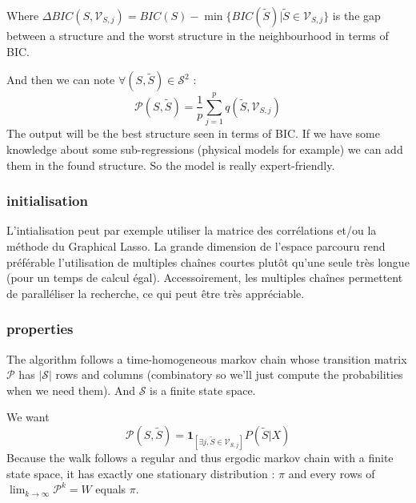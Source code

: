 \documentclass[12pt]{article}
\begin{document}
	Where $\Delta BIC(S,\mathcal{V}_{S,j})=BIC(S)-\min\{BIC(\tilde{S})| \tilde{S} \in \mathcal{V}_{S,j} \} $ is the gap between a structure and the worst structure in the neighbourhood in terms of BIC.
	\newline
	
	 And then we can note $\forall (S,\tilde{S}) \in \mathcal{S}^2 $ :
		\begin{displaymath}
			\mathcal{P}(S,\tilde{S})= \frac{1}{p} \sum_{j=1}^p q(\tilde{S},\mathcal{V}_{S,j})
		\end{displaymath}
	The output will be the best structure seen in terms of BIC. If we have some knowledge about some sub-regressions (physical models for example) we can add them in the found structure. So the model is really expert-friendly.



 \subsubsection{initialisation}
L'intialisation peut par exemple utiliser la matrice des corrélations et/ou la méthode du Graphical Lasso\cite{friedman2008sparse}.		
La grande dimension de l'espace parcouru rend préférable l'utilisation de multiples chaînes courtes plutôt qu'une seule très longue (pour un temps de calcul égal). Accessoirement, les multiples chaînes permettent de paralléliser la recherche, ce qui peut être très appréciable.


	\subsubsection{properties}
	The algorithm follows a time-homogeneous markov chain whose transition matrix $\mathcal{P}$ has $|\mathcal{S}|$ rows and columns (combinatory so we'll just compute the probabilities when we need them).
	And $\mathcal{S}$ is a finite state space.%
	
We want 
		\begin{equation}
			\mathcal{P}(S,\tilde{S})=\mathbf{1}_{[\exists j, \tilde{S} \in \mathcal{V}_{S,j} ]} P(\tilde{S}|X)
		\end{equation}
			Because the walk follows a regular and thus ergodic markov chain with a finite state space, it has exactly one stationary distribution \cite{grinstead1997introduction} : $\pi$ and every rows of $\operatorname{lim}_{k\rightarrow \infty}\mathcal{P}^k=W$ equals $\pi$.
\end{document}
